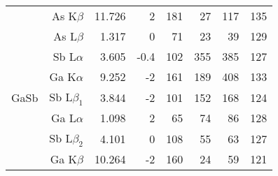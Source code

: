 \begin{table}[phtb]
\begin{center}
\begin{tabular}{rrrrrrrr}
                              & As K$\beta$   & 11.726          & 2                   & 181           & 27                & 117                & 135                                   \\
                              & As L$\beta$   & 1.317           & 0                   & 71            & 23                & 39                 & 129                                   \\
            \hline
                              & Sb L$\alpha$  & 3.605           & -0.4                & 102           & 355               & 385                & 127                                   \\
                              & Ga K$\alpha$  & 9.252           & -2                  & 161           & 189               & 408                & 133                                   \\
            GaSb              & Sb L$\beta_1$  & 3.844           & -2                  & 101           & 152               & 168                & 124                                   \\
                              & Ga L$\alpha$  & 1.098           & 2                   & 65            & 74                & 86                 & 128                                   \\
                              & Sb L$\beta_2$  & 4.101           & 0                   & 108           & 55                & 63                 & 127                                   \\
                              & Ga K$\beta$   & 10.264          & -2                  & 160           & 24                & 59                 & 121                                   \\
            \hline
        \end{tabular}
    \end{center}
\end{table}
